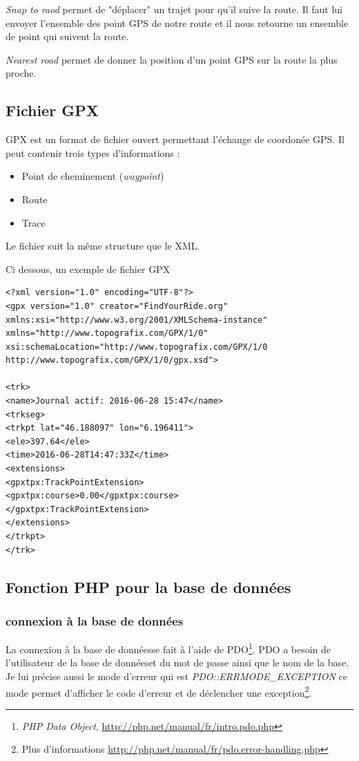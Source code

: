 \documentclass[a4paper]{article}
\newcommand{\bdd}{base de données}
\begin{document}
\emph{Snap to raod} permet de "déplacer" un trajet pour qu'il suive la route. Il faut lui envoyer l'ensemble des point GPS de notre route et il nous retourne un ensemble de point qui suivent la route.

\emph{Nearest road} permet de donner la position d'un point GPS sur la route la plus proche.

\subsection{Fichier GPX}
GPX est un format de fichier ouvert permettant l'échange de coordonée GPS. Il peut contenir trois types d'informations : 

\begin{itemize}
	\item Point de cheminement (\emph{waypoint})
	\item Route
	\item Trace
\end{itemize}

Le fichier suit la même structure que le XML.

Ci dessous, un exemple de fichier GPX

\begin{lstlisting}[frame=single] 
<?xml version="1.0" encoding="UTF-8"?>
<gpx version="1.0" creator="FindYourRide.org" xmlns:xsi="http://www.w3.org/2001/XMLSchema-instance" xmlns="http://www.topografix.com/GPX/1/0" xsi:schemaLocation="http://www.topografix.com/GPX/1/0 http://www.topografix.com/GPX/1/0/gpx.xsd">

<trk>
<name>Journal actif: 2016-06-28 15:47</name>
<trkseg>
<trkpt lat="46.188097" lon="6.196411">
<ele>397.64</ele>
<time>2016-06-28T14:47:33Z</time>
<extensions>
<gpxtpx:TrackPointExtension>
<gpxtpx:course>0.00</gpxtpx:course>
</gpxtpx:TrackPointExtension>
</extensions>
</trkpt>
</trk>

\end{lstlisting}


\subsection{Fonction PHP pour la \bdd}
\subsubsection{connexion à la \bdd}
La connexion à la \bdd se fait à l'aide de PDO\footnote{\emph{PHP Data Object}, \url{http://php.net/manual/fr/intro.pdo.php}}. PDO a besoin de l'utilisateur de la \bdd et du mot de passe ainsi que le nom de la base.
Je lui précise aussi le mode d'erreur qui est \emph{PDO::ERRMODE\_EXCEPTION} ce mode permet d'afficher le code d'erreur et de déclencher une exception\footnote{Plus d'informations \url{http://php.net/manual/fr/pdo.error-handling.php}}.
\end{document}
